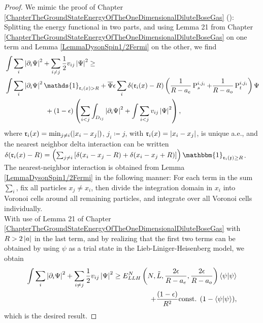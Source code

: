 \begin{proof}
	We mimic the proof of Chapter \ref{ChapterTheGroundStateEnergyOfTheOneDimensionalDiluteBoseGas} (\cite{agerskov2022ground}): Splitting the energy functional in two parts, and using Lemma 21 from Chapter \ref{ChapterTheGroundStateEnergyOfTheOneDimensionalDiluteBoseGas} on one term and Lemma \ref{LemmaDysonSpin1/2Fermi} on the other, we find 
	\begin{equation}
	\begin{aligned}
	&\int \sum_{i}\abs{\partial_i\Psi}^2+\sum_{i\neq j} \frac{1}{2}v_{ij}\abs{\Psi}^2\geq\\ &\int\sum_{i}\abs{\partial_i\Psi}^2\mathds{1}_{\mathfrak{r}_i(x)>R}+\overline{\Psi}\epsilon\sum_{i}\delta(\mathfrak{r}_i(x)-R)\left(\frac{1}{R-a_e}\operatorname{P}_s^{i,j_i}+\frac{1}{R-a_o}\operatorname{P}_t^{i,j_i}\right)\Psi\\&\qquad\qquad\qquad+ (1-\epsilon)\left(\sum_{i<j}\int_{D_{ij}}\abs{\partial_i \Psi}^2+\int\sum_{i<j} v_{ij} \abs{\Psi}^2\right),
	\end{aligned}
	\end{equation}
	where $ \mathfrak{r}_i(x)=\min_{j\neq i}(\left\lvert x_i-x_j \right\rvert) $, $ j_i\coloneqq j $, with $ \mathfrak{r}_i(x)=\left\lvert x_i-x_j \right\rvert $, is unique a.e., and the nearest neighbor delta interaction can be written $\delta(\mathfrak{r}_i(x)-R)=\left(\sum_{j\neq i}\left[\delta(x_i-x_j-R)+\delta(x_i-x_j+R)\right]\right)\mathbbm{1}_{\mathfrak{r_i(x)}\geq R}$. The nearest-neighbor interaction is obtained from Lemma \ref{LemmaDysonSpin1/2Fermi} in the following manner: For each term in the sum $ \sum_{i} $, fix all particles $ x_j\neq x_i $, then divide the integration domain in $ x_i $ into Voronoi cells around all remaining particles, and integrate over all Voronoi cells individually.\\
	With use of Lemma 21 of Chapter \ref{ChapterTheGroundStateEnergyOfTheOneDimensionalDiluteBoseGas} with $ R>2\left\lvert a \right\rvert $ in the last term, and by realizing that the first two terms can be obtained by using $ \psi $ as a trial state in the Lieb-Liniger-Heisenberg model, we obtain\begin{equation*}
	\begin{aligned}
	\int \sum_{i}\left\lvert \partial_i\Psi \right\rvert^2+\sum_{i\neq j} \frac{1}{2}v_{ij}\left\lvert \Psi \right\rvert^2\geq E_{LLH}^N \left(N,\tilde{L},\frac{2\epsilon}{R-a_e},\frac{2\epsilon}{R-a_o}\right)\left\langle\psi|\psi\right\rangle\\+ \frac{(1-\epsilon)}{R^2}\textnormal{const. }(1-\left\langle\psi|\psi\right\rangle),
	\end{aligned}
	\end{equation*}
	which is the desired result.
\end{proof}
